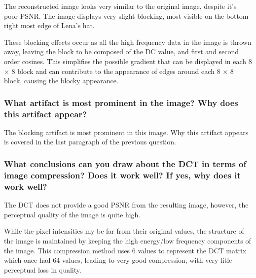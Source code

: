 The reconstructed image looks very similar to the original image, despite it's poor PSNR. The image displays very slight blocking, most visible on the bottom-right most edge of Lena's hat.

These blocking effects occur as all the high frequency data in the image is thrown away, leaving the block to be composed of the DC value, and first and second order cosines. This simplifies the possible gradient that can be displayed in each 8 $\times$ 8 block and can contribute to the appearance of edges around each 8 $\times$ 8 block, causing the blocky appearance.


\subsubsection{What artifact is most prominent in the image? Why does this artifact appear?}

The blocking artifact is most prominent in this image. Why this artifact appears is covered in the last paragraph of the previous question.

\subsubsection{What conclusions can you draw about the DCT in terms of image compression? Does it work well? If yes, why does it work well?}

The DCT does not provide a good PSNR from the resulting image, however, the perceptual quality of the image is quite high.

While the pixel intensities my be far from their original values, the structure of the image is maintained by keeping the high energy/low frequency components of the image. This compression method uses 6 values to represent the DCT matrix which once had 64 values, leading to very good compression, with very litle perceptual loss in quality.